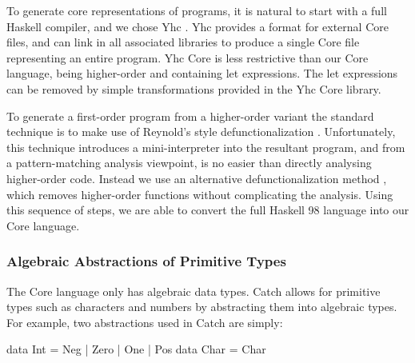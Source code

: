 \documentclass[preprint]{sigplanconf}
\begin{document}
To generate core representations of programs, it is natural to start with a full Haskell compiler, and we chose Yhc \citep{me:yhc_core}. Yhc provides a format for external Core files, and can link in all associated libraries to produce a single Core file representing an entire program. Yhc Core is less restrictive than our Core language, being higher-order and containing let expressions. The let expressions can be removed by simple transformations provided in the Yhc Core library.

To generate a first-order program from a higher-order variant the standard technique is to make use of Reynold's style defunctionalization \cite{reynolds:defunc}. Unfortunately, this technique introduces a mini-interpreter into the resultant program, and from a pattern-matching analysis viewpoint, is no easier than directly analysing higher-order code. Instead we use an alternative defunctionalization method \cite{me:firstify_icfp}, which removes higher-order functions without complicating the analysis. Using this sequence of steps, we are able to convert the full Haskell 98 language into our Core language.

\subsubsection{Algebraic Abstractions of Primitive Types}
\label{sec:abstraction}

\begin{comment}
Natural numbers are often encoded by Peano numerals, and this idea can easily be extended to integers:

\begin{code}
data Pos  = One | Succ Pos
data Int  = Minus Pos | Zero | Plus Pos
\end{code}

Although this abstraction of |Int| captures all the underlying detail of the number system, the underlying constraint systems discussed in \S\ref{sec:constraint} would be unable to distinguishing between any pair of numbers both greater than 2, or both less than -2.
\end{comment}

The Core language only has algebraic data types. Catch allows for primitive types such as characters and numbers by abstracting them into algebraic types. For example, two abstractions used in Catch are simply:

\begin{code}
data Int = Neg | Zero | One | Pos
data Char = Char
\end{code}
\end{document}
